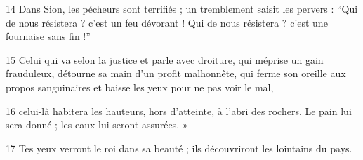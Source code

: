 
14 Dans Sion, les pécheurs sont terrifiés ; un tremblement saisit les pervers : “Qui de nous résistera ? c’est un feu dévorant ! Qui de nous résistera ? c’est une fournaise sans fin !”

15 Celui qui va selon la justice et parle avec droiture, qui méprise un gain frauduleux, détourne sa main d’un profit malhonnête, qui ferme son oreille aux propos sanguinaires et baisse les yeux pour ne pas voir le mal,

16 celui-là habitera les hauteurs, hors d’atteinte, à l’abri des rochers. Le pain lui sera donné ; les eaux lui seront assurées. »

17 Tes yeux verront le roi dans sa beauté ; ils découvriront les lointains du pays.
